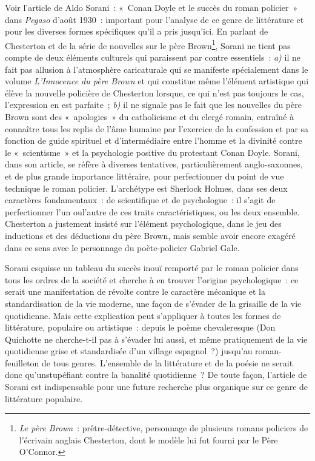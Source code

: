 \documentclass[french,twoside]{book} %
\begin{document}
Voir l’article de Aldo Sorani : « Conan Doyle et le succès du roman policier » dans \emph{Pegaso} d’août 1930 : important pour l’analyse de ce genre de littérature et pour les diverses formes spécifiques qu’il a pris jusqu’ici. En parlant de Chesterton et de la série de nouvelles sur le père Brown\footnote{\emph{Le père Brown} : prêtre-détective, personnage de plusieurs romans policiers de l’écrivain anglais Chesterton, dont le modèle lui fut fourni par le Père O'Connor.}, Sorani ne tient pas compte de deux éléments culturels qui paraissent par contre essentiels : \emph{a)} il ne fait pas allusion à l’atmosphère caricaturale qui se manifeste spécialement dans le volume \emph{L'Innocence du père Brown} et qui constitue même l’élément artistique qui élève la nouvelle policière de Chesterton lorsque, ce qui n’est pas toujours le cas, l’expression en est parfaite ; \emph{b)} il ne signale pas le fait que les nouvelles du père Brown sont des « apologies » du catholicisme et du clergé romain, entraîné à connaître tous les replis de l’âme humaine par l’exercice de la confession et par sa fonction de guide spirituel et d’intermédiaire entre l’homme et la divinité contre le « scientisme » et la psychologie positive du protestant Conan Doyle. Sorani, dans son article, se réfère à diverses tentatives, particulièrement anglo-saxonnes, et de plus grande importance littéraire, pour perfectionner du point de vue technique le roman policier. L'archétype est Sherlock Holmes, dans ses deux caractères fondamentaux : de scientifique et de psychologue : il s’agit de perfectionner l’un oul’autre de ces traits caractéristiques, ou les deux ensemble. Chesterton a justement insisté sur l’élément psychologique, dans le jeu des inductions et des déductions du père Brown, mais semble avoir encore exagéré dans ce sens avec le personnage du poète-policier Gabriel Gale.\par
Sorani esquisse un tableau du succès inouï remporté par le roman policier dans tous les ordres de la société et cherche à en trouver l’origine psychologique : ce serait une manifestation de révolte contre le caractère mécanique et la standardisation de la vie moderne, une façon de s’évader de la grisaille de la vie quotidienne. Mais cette explication peut s’appliquer à toutes les formes de littérature, populaire ou artistique : depuis le poème chevaleresque (Don Quichotte ne cherche-t-il pas à s’évader lui aussi, et même pratiquement de la vie quotidienne grise et standardisée d’un village espagnol ?) jusqu’au roman-feuilleton de tous genres. L'ensemble de la littérature et de la poésie ne serait donc qu’unstupéfiant contre la banalité quotidienne ? De toute façon, l’article de Sorani est indispensable pour une future recherche plus organique sur ce genre de littérature populaire.\par
\end{document}
